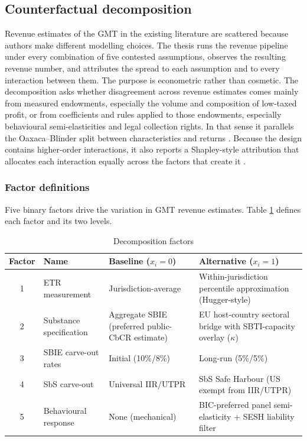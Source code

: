 \documentclass[11pt,a4paper]{article}
\begin{document}
\subsection{Counterfactual decomposition}\label{sec:decomposition}

Revenue estimates of the GMT in the existing literature are scattered because authors make different modelling choices. The thesis runs the revenue pipeline under every combination of five contested assumptions, observes the resulting revenue number, and attributes the spread to each assumption and to every interaction between them. The purpose is econometric rather than cosmetic. The decomposition asks whether disagreement across revenue estimates comes mainly from measured endowments, especially the volume and composition of low-taxed profit, or from coefficients and rules applied to those endowments, especially behavioural semi-elasticities and legal collection rights. In that sense it parallels the Oaxaca--Blinder split between characteristics and returns \citep{oaxaca1973,blinder1973}. Because the design contains higher-order interactions, it also reports a Shapley-style attribution that allocates each interaction equally across the factors that create it \citep{shorrocks2013}.

\subsubsection{Factor definitions}\label{sec:factors}

Five binary factors drive the variation in GMT revenue estimates. Table \ref{tab:factors} defines each factor and its two levels.

\begin{table}[H]
\centering
\caption{Decomposition factors}
\label{tab:factors}
\small
\begin{tabular}{@{}clp{3.5cm}p{3.5cm}@{}}
\toprule
Factor & Name & Baseline ($x_i = 0$) & Alternative ($x_i = 1$) \\
\midrule
1 & ETR measurement & Jurisdiction-average & Within-jurisdiction percentile approximation (Hugger-style) \\
2 & Substance specification & Aggregate SBIE (preferred public-CbCR estimate) & EU host-country sectoral bridge with SBTI-capacity overlay ($\kappa$) \\
3 & SBIE carve-out rates & Initial (10\%/8\%) & Long-run (5\%/5\%) \\
4 & SbS carve-out & Universal IIR/UTPR & SbS Safe Harbour (US exempt from IIR/UTPR) \\
5 & Behavioural response & None (mechanical) & BIC-preferred panel semi-elasticity + SESH liability filter \\
\bottomrule
\end{tabular}
\end{table}
\end{document}
